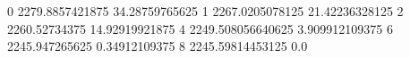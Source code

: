 0 2279.8857421875 34.28759765625
1 2267.0205078125 21.42236328125
2 2260.52734375 14.92919921875
4 2249.508056640625 3.909912109375
6 2245.947265625 0.34912109375
8 2245.59814453125 0.0
